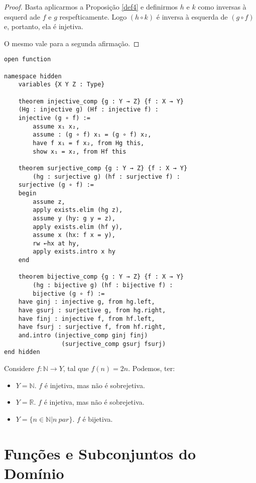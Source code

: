 \begin{proof}
    Basta aplicarmos a Proposição \ref{def4} e definirmos $h$ e $k$ como
    inversas à esquerd ade $f$ e $g$ respefticamente. Logo $(h \circ k)$
    é inversa à esquerda de  $(g \circ f)$ e, portanto, ela é injetiva.

    O mesmo vale para a segunda afirmação.
\end{proof}

\begin{lstlisting}
open function

namespace hidden
    variables {X Y Z : Type}

    theorem injective_comp {g : Y → Z} {f : X → Y}
    (Hg : injective g) (Hf : injective f) :
    injective (g ∘ f) :=
        assume x₁ x₂,
        assume : (g ∘ f) x₁ = (g ∘ f) x₂,
        have f x₁ = f x₂, from Hg this,
        show x₁ = x₂, from Hf this

    theorem surjective_comp {g : Y → Z} {f : X → Y}
        (hg : surjective g) (hf : surjective f) :
    surjective (g ∘ f) :=
    begin
        assume z,
        apply exists.elim (hg z),
        assume y (hy: g y = z),
        apply exists.elim (hf y),
        assume x (hx: f x = y),
        rw ←hx at hy,
        apply exists.intro x hy
    end

    theorem bijective_comp {g : Y → Z} {f : X → Y}
        (hg : bijective g) (hf : bijective f) :
        bijective (g ∘ f) :=
    have ginj : injective g, from hg.left,
    have gsurj : surjective g, from hg.right,
    have finj : injective f, from hf.left,
    have fsurj : surjective f, from hf.right,
    and.intro (injective_comp ginj finj)
                (surjective_comp gsurj fsurj)
end hidden
\end{lstlisting}

\begin{example}
    Considere $f: \mathbb{N} \to Y$, tal que $f(n) = 2n$. Podemos, ter:
    \begin{itemize}
        \item $Y = \mathbb{N}$. $f$ é injetiva, mas não é sobrejetiva.
        \item $Y = \mathbb{R}$. $f$ é injetiva, mas não é sobrejetiva.
        \item $Y = \{n \in \mathbb{N} | n~par\}$. $f$ é bijetiva.
    \end{itemize}
\end{example}

\section{Funções e Subconjuntos do Domínio}

